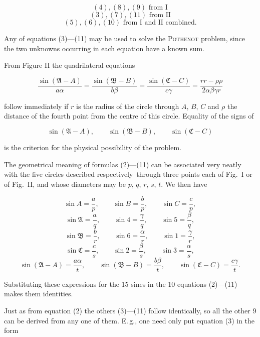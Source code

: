 
\[
(4), (8), (9) \text{ from I}
\]
\[
(3), (7), (11) \text{ from II}
\]
\[
(5), (6), (10) \text{ from I and II combined.}
\]

Any of equations (3)—(11) may be used to solve the \textsc{Pothenot} problem, since the two unknowns occurring in each equation have a known sum.

From Figure II the quadrilateral equations

\[
\frac{\sin(\mathfrak{A}-A)}{a\alpha} = \frac{\sin(\mathfrak{B}-B)}{b\beta} = \frac{\sin(\mathfrak{C}-C)}{c\gamma} = \frac{rr-\rho\rho}{2\alpha\beta\gamma r}
\]

follow immediately if $r$ is the radius of the circle through $A$, $B$, $C$ and $\rho$ the distance of the fourth point from the centre of this circle. Equality of the signs of

\[
\sin(\mathfrak{A}-A), \qquad \sin(\mathfrak{B}-B), \qquad \sin(\mathfrak{C}-C)
\]

is the criterion for the physical possibility of the problem.

The geometrical meaning of formulas (2)—(11) can be associated very neatly with the five circles described respectively\ through three points each of Fig.\ I or of Fig.\ II, and whose diameters may be $p$, $q$, $r$, $s$, $t$. We then have

\[
\sin A = \frac{a}{p}, \qquad \sin B = \frac{b}{p}, \qquad \sin C = \frac{c}{p},
\]
\[
\sin\mathfrak{A} = \frac{a}{q}, \qquad \sin 4 = \frac{\gamma}{q}, \qquad \sin 5 = \frac{\beta}{q},
\]
\[
\sin\mathfrak{B} = \frac{b}{r}, \qquad \sin 6 = \frac{\alpha}{r}, \qquad \sin 1 = \frac{\gamma}{r},
\]
\[
\sin\mathfrak{C} = \frac{c}{s}, \qquad \sin 2 = \frac{\beta}{s}, \qquad \sin 3 = \frac{\alpha}{s},
\]
\[
\sin(\mathfrak{A}-A) = \frac{a\alpha}{t}, \qquad \sin(\mathfrak{B}-B) = \frac{b\beta}{t}, \qquad \sin(\mathfrak{C}-C) = \frac{c\gamma}{t}.
\]

Substituting these expressions for the 15 sines in the 10 equations (2)—(11) makes them identities.

Just as from equation (2) the others (3)—(11) follow identically, so all the other 9 can be derived from any one of them. E.\,g., one need only put equation (3) in the form
